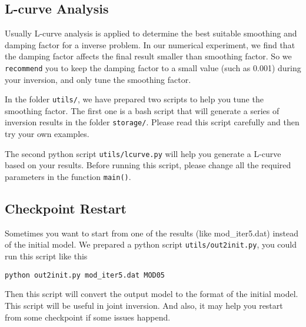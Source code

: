 \documentclass[UTF8]{article}
\begin{document}
\subsection{L-curve Analysis}
Usually L-curve analysis is applied to determine the best 
suitable smoothing and damping factor for a inverse problem. In our 
numerical experiment, we find that the damping factor affects the 
final result smaller than smoothing factor. So we \texttt{recommend}
you to keep the damping factor to a small value (such as 0.001) during 
your inversion, and only tune the smoothing factor. 


In the folder \texttt{utils/}, we have prepared two scripts to help 
you tune the smoothing factor. The first one is a bash script 
\texttt{}
that will generate a series of inversion results in the folder 
\texttt{storage/}. Please read 
this script carefully and then try your own examples.

The second python script \texttt{utils/lcurve.py} will help you 
generate a L-curve based on your results. Before running 
this script, please change all the 
required parameters in the function \texttt{main()}.  

\subsection{Checkpoint Restart}
Sometimes you want to start from one of the results (like mod\_iter5.dat)
instead of the initial model. We prepared a python script
\texttt{utils/out2init.py}, you could run this script like this 
\begin{lstlisting}
python out2init.py mod_iter5.dat MOD05 
\end{lstlisting}
Then this script will convert the output model to the format 
of the initial model. This script will be useful in joint inversion.
And also, it may help you restart from some checkpoint if some issues 
happend.




\end{document}
